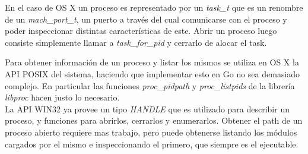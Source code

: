 En el caso de OS X un proceso es representado por un \textit{task\_t} que es un
renombre de un \textit{mach\_port\_t}, un puerto a través del cual comunicarse
con el proceso y poder inspeccionar distintas características de este. Abrir un
proceso luego consiste simplemente llamar a \textit{task\_for\_pid} y cerrarlo
de alocar el task.

Para obtener información de un proceso y listar los mismos se utiliza en OS X
la API POSIX del sistema, haciendo que implementar esto en Go no sea demasiado
complejo. En particular las funciones \textit{proc\_pidpath} y
\textit{proc\_listpids} de la librería \textit{libproc} hacen justo lo
necesario.\\

La API WIN32 ya provee un tipo \textit{HANDLE} que es utilizado para describir
un proceso, y funciones para abrirlos, cerrarlos y enumerarlos. Obtener el path
de un proceso abierto requiere mas trabajo, pero puede obtenerse listando los
módulos cargados por el mismo e inspeccionando el primero, que siempre es el
ejecutable.\\

